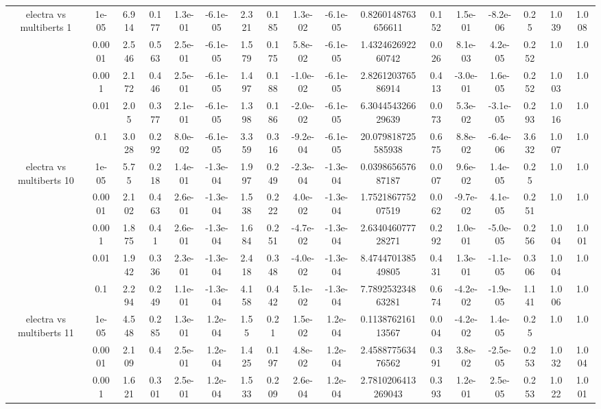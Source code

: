 \begin{tabular}{|c|c|c|c|c|c|c|c|c|c|c|c|c|c|c|c|c|}
\hline
\multirow{5}{*}{electra  vs multiberts 1} & 1e-05 & 6.914 & 0.177 & 1.3e-01 & -6.1e-05 & 2.321 & 0.185 & 1.3e-02 & -6.1e-05 & 0.8260148763656611 & 0.152 & 1.5e-01 & -8.2e-06 & 0.25 & 1.039 & 1.008 \\
 & 0.0001 & 2.546 & 0.563 & 2.5e-01 & -6.1e-05 & 1.579 & 0.175 & 5.8e-02 & -6.1e-05 & 1.432462692260742 & 0.026 & 8.1e-03 & 4.2e-05 & 0.252 & 1.0 & 1.0 \\
 & 0.001 & 2.172 & 0.446 & 2.5e-01 & -6.1e-05 & 1.497 & 0.188 & -1.0e-02 & -6.1e-05 & 2.826120376586914 & 0.413 & -3.0e-01 & 1.6e-05 & 0.252 & 1.003 & 1.0 \\
 & 0.01 & 2.05 & 0.377 & 2.1e-01 & -6.1e-05 & 1.398 & 0.186 & -2.0e-02 & -6.1e-05 & 6.304454326629639 & 0.073 & 5.3e-02 & -3.1e-05 & 0.293 & 1.016 & 1.0 \\
 & 0.1 & 3.028 & 0.292 & 8.0e-02 & -6.1e-05 & 3.359 & 0.316 & -9.2e-04 & -6.1e-05 & 20.079818725585938 & 0.675 & 8.8e-02 & -6.4e-06 & 3.632 & 1.007 & 1.0 \\
\hline
\multirow{5}{*}{electra  vs multiberts 10} & 1e-05 & 5.75 & 0.218 & 1.4e-01 & -1.3e-04 & 1.997 & 0.249 & -2.3e-04 & -1.3e-04 & 0.039865657687187 & 0.007 & 9.6e-02 & 1.4e-05 & 0.25 & 1.0 & 1.0 \\
 & 0.0001 & 2.102 & 0.463 & 2.6e-01 & -1.3e-04 & 1.538 & 0.222 & 4.0e-02 & -1.3e-04 & 1.752186775207519 & 0.062 & -9.7e-02 & 4.1e-05 & 0.251 & 1.0 & 1.0 \\
 & 0.001 & 1.875 & 0.41 & 2.6e-01 & -1.3e-04 & 1.684 & 0.251 & -4.7e-02 & -1.3e-04 & 2.634046077728271 & 0.292 & 1.0e-01 & -5.0e-05 & 0.256 & 1.004 & 1.001 \\
 & 0.01 & 1.942 & 0.336 & 2.3e-01 & -1.3e-04 & 2.418 & 0.348 & -4.0e-02 & -1.3e-04 & 8.474470138549805 & 0.431 & 1.3e-01 & -1.1e-05 & 0.306 & 1.004 & 1.0 \\
 & 0.1 & 2.294 & 0.249 & 1.1e-01 & -1.3e-04 & 4.158 & 0.442 & 5.1e-02 & -1.3e-04 & 7.789253234863281 & 0.674 & -4.2e-02 & -1.9e-05 & 1.141 & 1.006 & 1.0 \\
\hline
\multirow{5}{*}{electra  vs multiberts 11} & 1e-05 & 4.548 & 0.285 & 1.3e-01 & 1.2e-04 & 1.55 & 0.21 & 1.5e-02 & 1.2e-04 & 0.113876216113567 & 0.004 & -4.2e-02 & 1.4e-05 & 0.25 & 1.0 & 1.0 \\
 & 0.0001 & 2.109 & 0.4 & 2.5e-01 & 1.2e-04 & 1.425 & 0.197 & 4.8e-02 & 1.2e-04 & 2.458877563476562 & 0.391 & 3.8e-02 & -2.5e-05 & 0.253 & 1.032 & 1.004 \\
 & 0.001 & 1.621 & 0.301 & 2.5e-01 & 1.2e-04 & 1.533 & 0.209 & 2.6e-04 & 1.2e-04 & 2.7810206413269043 & 0.393 & 1.2e-01 & 2.5e-05 & 0.253 & 1.022 & 1.001 \\

\end{tabular}
